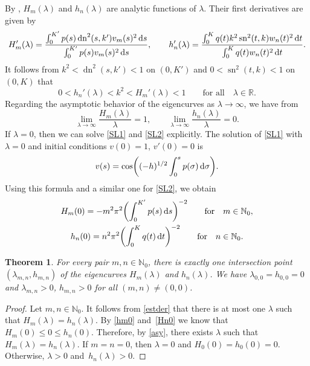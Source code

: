 \documentclass[pdftex]{sigma}
\newtheorem{thm}{Theorem}[section]
\newcommand{\R}{\mathbb{R}}
\newcommand{\N}{\mathbb{N}}
\DeclareMathOperator{\sn}{sn}
\DeclareMathOperator{\dn}{dn}
\numberwithin{equation}{section}
\begin{document}
By \cite[Theorem 2.1]{BV}, $H_m(\lambda)$ and $h_n(\lambda)$ are analytic functions of $\lambda$. Their first derivatives \cite[formula~(2.5)]{BV} are given by
\begin{gather*}
H_m'(\lambda)=\frac{\int_0^{K'} p(s)\dn^2(s,k') v_m(s)^2\,{\rm d}s}{\int_0^{K'} p(s)v_m(s)^2\,{\rm d}s},\qquad
h_n'(\lambda)=\frac{\int_0^{K} q(t)k^2\sn^2(t,k) w_n(t)^2\,{\rm d}t}{\int_0^{K} q(t)w_n(t)^2\,{\rm d}t}.
\end{gather*}
It follows from $k^2<\dn^2(s,k')<1$ on $(0,K')$ and $0<\sn^2(t,k)<1$ on $(0,K)$ that
\begin{equation}\label{estder}
0<h_n'(\lambda)<k^2<H_m'(\lambda)<1\qquad \text{for all} \quad \lambda\in\R.
\end{equation}
Regarding the asymptotic behavior of the eigencurves as $\lambda\to\infty$, we have from \cite[Theorem 2.2]{BV}%
\begin{equation}\label{asy}
\lim_{\lambda\to\infty} \frac{H_m(\lambda)}{\lambda}=1,\qquad \lim_{\lambda\to\infty} \frac{h_n(\lambda)}{\lambda}=0.
\end{equation}
If $\lambda=0$, then we can solve \eqref{SL1} and \eqref{SL2} explicitly.
The solution of \eqref{SL1} with $\lambda=0$ and initial conditions $v(0)=1$, $v'(0)=0$ is
\[ v(s)=\cos\biggl((-h)^{1/2}\int_0^s p(\sigma)\,{\rm d}\sigma\biggr).\]
Using this formula and a similar one for \eqref{SL2}, we obtain
\begin{gather}\label{hm0}
 H_m(0)=-m^2\pi^2 \biggl(\int_0^{K'} p(s)\,{\rm d}s\biggr)^{-2} \qquad \text{for}\quad m\in\N_0,\\
h_n(0)=n^2\pi^2 \biggl(\int_0^{K} q(t)\,{\rm d}t\biggr)^{-2} \qquad \text{for} \quad n\in\N_0.\label{Hn0}
\end{gather}

\begin{thm}\label{t1}
For every pair $m,n\in\N_0$, there is exactly one intersection point $(\lambda_{m,n},h_{m,n})$ of the
eigencurves $H_m(\lambda)$ and $h_n(\lambda)$. We have $\lambda_{0,0}=h_{0,0}=0$ and $\lambda_{m,n}>0$, $h_{m,n}>0$ for all $(m,n)\ne (0,0)$.
\end{thm}
\begin{proof}
Let $m,n\in\N_0$. It follows from \eqref{estder} that there is at most one $\lambda$ such that ${H_m(\lambda)\!=\!h_n(\lambda)}$.
By \eqref{hm0} and~\eqref{Hn0} we know that $H_m(0)\le 0\le h_n(0)$. Therefore, by \eqref{asy}, there exists $\lambda$ such that $H_m(\lambda)=h_n(\lambda)$. If $m=n=0$, then $\lambda=0$ and $H_0(0)=h_0(0)=0$. Otherwise, $\lambda>0$ and~$h_n(\lambda)>0$.
\end{proof}
\end{document}
